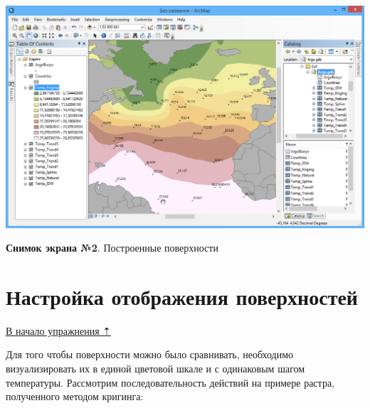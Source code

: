 \documentclass[]{book}
\theoremstyle{definition}
\theoremstyle{definition}
\theoremstyle{definition}
\theoremstyle{remark}
\begin{document}
\includegraphics{images/Ex16/image9.png}

\textbf{Снимок экрана №2}. Построенные поверхности

\hypertarget{interpolation-visualization}{%
\section{Настройка отображения
поверхностей}\label{interpolation-visualization}}

\protect\hyperlink{interpolation}{В начало упражнения ⇡}

Для того чтобы поверхности можно было сравнивать, необходимо
визуализировать их в единой цветовой шкале и с одинаковым шагом
температуры. Рассмотрим последовательность действий на примере растра,
полученного методом кригинга:
\end{document}
